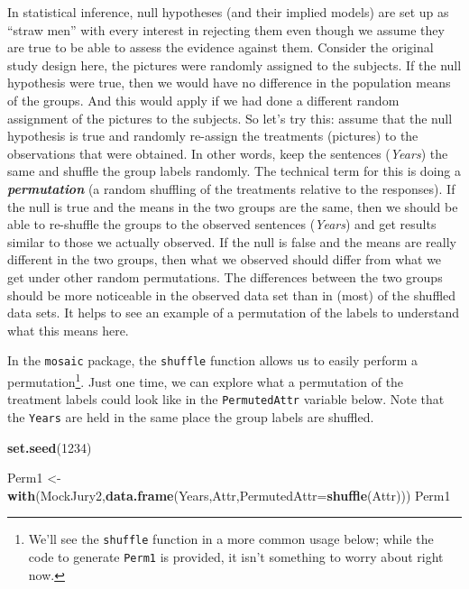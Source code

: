 \documentclass[]{book}
\newenvironment{Shaded}{\begin{snugshade}}{\end{snugshade}}
\newcommand{\KeywordTok}[1]{\textcolor[rgb]{0.13,0.29,0.53}{\textbf{#1}}}
\newcommand{\DataTypeTok}[1]{\textcolor[rgb]{0.13,0.29,0.53}{#1}}
\newcommand{\DecValTok}[1]{\textcolor[rgb]{0.00,0.00,0.81}{#1}}
\newcommand{\StringTok}[1]{\textcolor[rgb]{0.31,0.60,0.02}{#1}}
\newcommand{\NormalTok}[1]{#1}
\let\rmarkdownfootnote\footnote%
\def\footnote{\protect\rmarkdownfootnote}
\theoremstyle{definition}
\theoremstyle{definition}
\theoremstyle{remark}
\begin{document}
In statistical inference, null hypotheses (and their implied models) are
set up as ``straw men'' with every interest in rejecting them even
though we assume they are true to be able to assess the evidence against
them. Consider the original study design here, the pictures were
randomly assigned to the subjects. If the null hypothesis were true,
then we would have no difference in the population means of the groups.
And this would apply if we had done a different random assignment of the
pictures to the subjects. So let's try this: assume that the null
hypothesis is true and randomly re-assign the treatments (pictures) to
the observations that were obtained. In other words, keep the sentences
(\emph{Years}) the same and shuffle the group labels randomly. The
technical term for this is doing a \textbf{\emph{permutation}} (a random
shuffling of the treatments relative to the responses). If the null is
true and the means in the two groups are the same, then we should be
able to re-shuffle the groups to the observed sentences (\emph{Years})
and get results similar to those we actually observed. If the null is
false and the means are really different in the two groups, then what we
observed should differ from what we get under other random permutations.
The differences between the two groups should be more noticeable in the
observed data set than in (most) of the shuffled data sets. It helps to
see an example of a permutation of the labels to understand what this
means here.

In the \texttt{mosaic} package, the \texttt{shuffle} function allows us
to easily perform a permutation\footnote{We'll see the \texttt{shuffle}
  function in a more common usage below; while the code to generate
  \texttt{Perm1} is provided, it isn't something to worry about right
  now.}. Just one time, we can explore what a permutation of the
treatment labels could look like in the \texttt{PermutedAttr} variable
below. Note that the \texttt{Years} are held in the same place the group
labels are shuffled.

\begin{Shaded}
\begin{Highlighting}[]
\KeywordTok{set.seed}\NormalTok{(}\DecValTok{1234}\NormalTok{)}
\end{Highlighting}
\end{Shaded}

\begin{Shaded}
\begin{Highlighting}[]
\NormalTok{Perm1 <-}\StringTok{ }\KeywordTok{with}\NormalTok{(MockJury2,}\KeywordTok{data.frame}\NormalTok{(Years,Attr,}\DataTypeTok{PermutedAttr=}\KeywordTok{shuffle}\NormalTok{(Attr)))}
\NormalTok{Perm1}
\end{Highlighting}
\end{Shaded}
\end{document}
